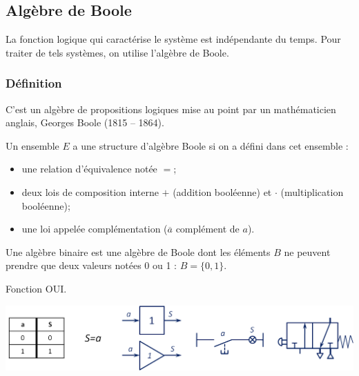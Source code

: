 \subsection{Algèbre de Boole}

La fonction logique qui caractérise le système est indépendante du temps. Pour traiter de tels systèmes, on utilise l'algèbre de Boole. 

\subsubsection{Définition}
C'est un algèbre de propositions logiques mise au point par un mathématicien anglais, Georges Boole (1815 -- 1864).

\begin{defi}
Un ensemble $E$ a une structure d'algèbre Boole si on a défini dans cet ensemble :
\begin{itemize}
\item une relation d'équivalence notée $=$;
\item deux lois de composition interne $+$ (addition booléenne) et $\cdot$ (multiplication booléenne);
\item une loi appelée complémentation ($\overline{a}$ complément de $a$).
\end{itemize}
\end{defi}

Une algèbre binaire est une algèbre de Boole dont les éléments $B$ ne peuvent prendre que deux valeurs notées 0 ou 1 : $B=\{0,1 \}$. 

\begin{exemple}
Fonction OUI.

\begin{center}
\includegraphics[width=.9\textwidth]{images/oui}
\end{center}
\end{exemple}


